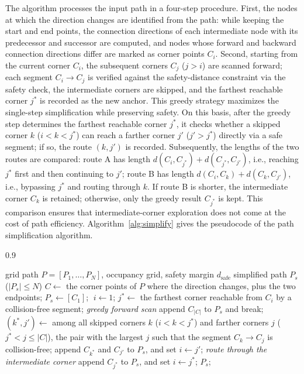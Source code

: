 \documentclass[lettersize,journal]{IEEEtran}
\begin{document}
The algorithm processes the input path in a four-step procedure. First, the nodes at which the direction changes are identified from the path: while keeping the start and end points, the connection directions of each intermediate node with its predecessor and successor are computed, and nodes whose forward and backward connection directions differ are marked as corner points $C_i$. Second, starting from the current corner $C_i$, the subsequent corners $C_j$ ($j > i$) are scanned forward; each segment $C_i \to C_j$ is verified against the safety-distance constraint via the safety check, the intermediate corners are skipped, and the farthest reachable corner $j^{*}$ is recorded as the new anchor. This greedy strategy maximizes the single-step simplification while preserving safety. On this basis, after the greedy step determines the farthest reachable corner $j^{*}$, it checks whether a skipped corner $k$ ($i < k < j^{*}$) can reach a farther corner $j'$ ($j' > j^{*}$) directly via a safe segment; if so, the route $(k, j')$ is recorded. Subsequently, the lengths of the two routes are compared: route A has length $d(C_i, C_{j^{*}}) + d(C_{j^{*}}, C_{j'})$, i.e., reaching $j^{*}$ first and then continuing to $j'$; route B has length $d(C_i, C_k) + d(C_k, C_{j'})$, i.e., bypassing $j^{*}$ and routing through $k$. If route B is shorter, the intermediate corner $C_k$ is retained; otherwise, only the greedy result $C_{j^{*}}$ is kept. This comparison ensures that intermediate-corner exploration does not come at the cost of path efficiency. Algorithm~\textcolor{blue}{\ref{alg:simplify}} gives the pseudocode of the path simplification algorithm.

\begin{algorithm}[!t]
\caption{Safety-distance-aware path simplification}
\label{alg:simplify}
\begin{spacing}{0.9}
\begin{algorithmic}[1]
\REQUIRE grid path $P = [P_1, \ldots, P_N]$, occupancy grid, safety margin $d_{\mathrm{safe}}$
\ENSURE simplified path $P_s$ ($|P_s| \leq N$)
\STATE $C \gets$ the corner points of $P$ where the direction changes, plus the two endpoints;
\STATE $P_s \gets [C_1]$; $\; i \gets 1$;
\STATE $j^{*} \gets$ the farthest corner reachable from $C_i$ by a collision-free segment; \quad\textit{greedy forward scan}
\STATE append $C_{|C|}$ to $P_s$ and break;
\ENDIF
\STATE $(k^{*}, j') \gets$ among all skipped corners $k$ ($i < k < j^{*}$) and farther corners $j$ ($j^{*} < j \leq |C|$), the pair with the largest $j$ such that the segment $C_k \to C_j$ is collision-free;
\STATE append $C_{k^{*}}$ and $C_{j'}$ to $P_s$, and set $i \gets j'$; \quad\textit{route through the intermediate corner}
\ELSE
\STATE append $C_{j^{*}}$ to $P_s$, and set $i \gets j^{*}$;
\ENDIF
\ENDWHILE
\RETURN $P_s$;
\end{algorithmic}
\end{spacing}
\end{algorithm}
\end{document}
